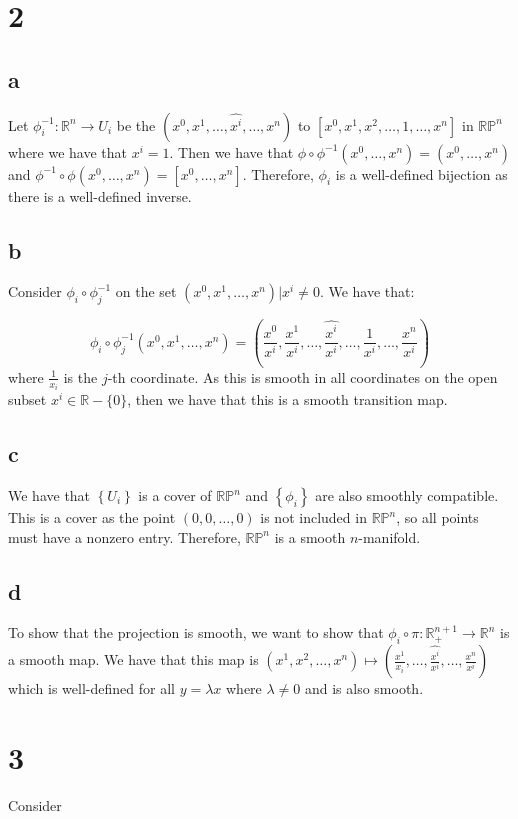 \documentclass{article}
\theoremstyle{definition}
\numberwithin{theorem}{section}
\numberwithin{equation}{section}
\begin{document}
\section{2}
\subsection{a}

Let $\phi_i^{-1} : \mathbb{R}^n \rightarrow U_i$ be the $(x^0, x^1, \ldots, \hat{x^i}, \ldots, x^n)$ to $[x^0, x^1, x^2, \ldots, 1, \ldots, x^n]$ in $\mathbb{RP}^n$ where we have that $x^i = 1$. Then we have that $\phi \circ \phi^{-1} (x^0, \ldots, x^n) = (x^0, \ldots, x^n)$ and $\phi^{-1} \circ \phi(x^0, \ldots, x^n) = [x^0, \ldots, x^n]$. Therefore, $\phi_i$ is a well-defined bijection as there is a well-defined inverse. 

\subsection{b}

Consider $\phi_i \circ \phi_j^{-1}$ on the set ${(x^0, x^1, \ldots, x^n) | x^i \neq 0}$. We have that:

\begin{equation}
    \phi_i \circ \phi_j^{-1}(x^0, x^1, \ldots, x^n) = (\frac{x^0}{x^i}, \frac{x^1}{x^i}, \ldots, \hat{\frac{x^i}{x^i}}, \ldots, \frac{1}{x^i}, \ldots, \frac{x^n}{x^i})
\end{equation}
where $\frac{1}{x_i}$ is the $j$-th coordinate. As this is smooth in all coordinates on the open subset $x^i \in \mathbb{R} - \{0\}$, then we have that this is a smooth transition map. 

\subsection{c}
We have that $\left\{U_i\right\}$ is a cover of $\mathbb{RP}^n$ and $\left\{\phi_i\right\}$ are also smoothly compatible. This is a cover as the point $(0, 0, \ldots, 0)$ is not included in $\mathbb{RP}^n$, so all points must have a nonzero entry. Therefore, $\mathbb{RP}^n$ is a smooth $n$-manifold. 

\subsection{d}
To show that the projection is smooth, we want to show that $\phi_i \circ \pi : \mathbb{R}^{n + 1}_+ \rightarrow \mathbb{R}^{n}$ is a smooth map. We have that this map is $(x^1, x^2, \ldots, x^n) \mapsto (\frac{x^1}{x_i}, \ldots, \widehat{\frac{x^i}{x^i}}, \ldots, \frac{x^n}{x^i})$ which is well-defined for all $y = \lambda x$ where $\lambda \neq 0$ and is also smooth. 

\section{3}

Consider 
\end{document}
